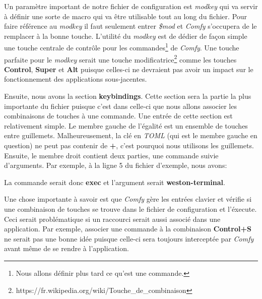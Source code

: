 \documentclass[titlepage]{article}
\begin{document}
\par
Un paramètre important de notre fichier de configuration est \textit{modkey}
qui va servir à définir une sorte de macro qui va être utilisable tout au long
du fichier. Pour faire référence au \textit{modkey} il faut seulement entrer
\textit{\$mod} et \textit{Comfy} s'occupera de le remplacer à la bonne touche.
L'utilité du \textit{modkey} est de dédier de façon simple une touche centrale
de contrôle pour les commandes\footnote{Nous allons définir plus tard ce qu'est
une commande.} de \textit{Comfy}. Une touche parfaite pour le \textit{modkey}
serait une touche
modificatrice\footnote{https://fr.wikipedia.org/wiki/Touche\_de\_combinaison}
comme les touches \textbf{Control}, \textbf{Super} et \textbf{Alt} puisque
celles-ci ne devraient pas avoir un impact sur le fonctionnement des
applications sous-jacentes.
\par
\bigskip
Ensuite, nous avons la section \textbf{keybindings}. Cette section sera la
partie la plus importante du fichier puisque c'est dans celle-ci que nous
allons associer les combinaisons de touches à une commande. Une entrée de cette
section est relativement simple. Le membre gauche de l'égalité est un ensemble
de touches entre guillemets. Malheureusement, la clé en \textit{TOML} (qui est
le membre gauche en question) ne peut pas contenir de \textbf{+}, c'est
pourquoi nous utilisons les guillemets. Ensuite, le membre droit contient deux
parties, une commande suivie d'arguments. Par exemple, à la ligne 5 du fichier
d'exemple, nous avons:



La commande serait donc \textbf{exec} et l'argument serait
\textbf{weston-terminal}.

\par
\bigskip
Une chose importante à savoir est que \textit{Comfy} gère les entrées clavier
et vérifie si une combinaison de touches se trouve dans le fichier de
configuration et l'éxecute. Ceci serait problématique si un raccourci serait
aussi associé dans une application. Par exemple, associer une commande à la
combinaison \textbf{Control+S} ne serait pas une bonne idée puisque celle-ci
sera toujours interceptée par \textit{Comfy} avant même de se rendre à
l'application.
\end{document}
